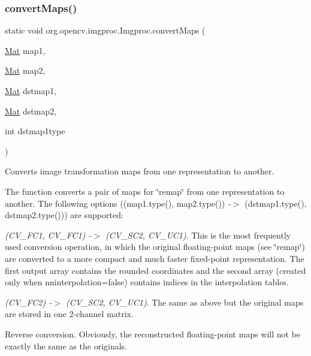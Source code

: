 \subsubsection{\texorpdfstring{convert\+Maps()}{convertMaps()}\hspace{0.1cm}{\footnotesize\ttfamily [2/2]}}
{\footnotesize\ttfamily static void org.\+opencv.\+imgproc.\+Imgproc.\+convert\+Maps (\begin{DoxyParamCaption}\item[{\mbox{\hyperlink{classorg_1_1opencv_1_1core_1_1_mat}{Mat}}}]{map1,  }\item[{\mbox{\hyperlink{classorg_1_1opencv_1_1core_1_1_mat}{Mat}}}]{map2,  }\item[{\mbox{\hyperlink{classorg_1_1opencv_1_1core_1_1_mat}{Mat}}}]{dstmap1,  }\item[{\mbox{\hyperlink{classorg_1_1opencv_1_1core_1_1_mat}{Mat}}}]{dstmap2,  }\item[{int}]{dstmap1type }\end{DoxyParamCaption})\hspace{0.3cm}{\ttfamily [static]}}

Converts image transformation maps from one representation to another.

The function converts a pair of maps for \char`\"{}remap\char`\"{} from one representation to another. The following options ({\ttfamily (map1.\+type(), map2.\+type())} {\itshape -\/$>$} {\ttfamily (dstmap1.\+type(), dstmap2.\+type())}) are supported\+:


\begin{DoxyItemize}
\item {\itshape (C\+V\+\_\+F\+C1, C\+V\+\_\+F\+C1) -\/$>$ (C\+V\+\_\+S\+C2, C\+V\+\_\+U\+C1)}. This is the most frequently used conversion operation, in which the original floating-\/point maps (see \char`\"{}remap\char`\"{}) are converted to a more compact and much faster fixed-\/point representation. The first output array contains the rounded coordinates and the second array (created only when {\ttfamily nninterpolation=false}) contains indices in the interpolation tables. 
\item {\itshape (C\+V\+\_\+F\+C2) -\/$>$ (C\+V\+\_\+S\+C2, C\+V\+\_\+U\+C1)}. The same as above but the original maps are stored in one 2-\/channel matrix. 
\item Reverse conversion. Obviously, the reconstructed floating-\/point maps will not be exactly the same as the originals. 
\end{DoxyItemize}


